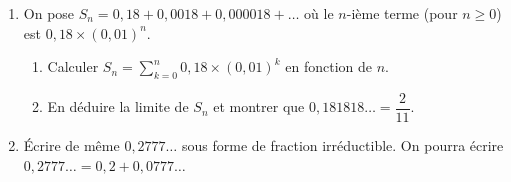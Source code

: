 
\begin{enumerate}
  \item On pose $S_n=0{,}18+0{,}0018+0{,}000018+\dots$ où le $n$-ième terme (pour $n\ge0$) est $0{,}18\times(0{,}01)^n$.
  \begin{enumerate}
    \item Calculer $S_n=\sum_{k=0}^{n}0{,}18\times(0{,}01)^k$ en fonction de $n$.
    \item En déduire la limite de $S_n$ et montrer que $0{,}181818\ldots=\dfrac2{11}$.
  \end{enumerate}
  \item Écrire de même $0{,}2777\ldots$ sous forme de fraction irréductible. On pourra écrire $0{,}2777\ldots=0{,}2+0{,}0777\ldots$
\end{enumerate}

